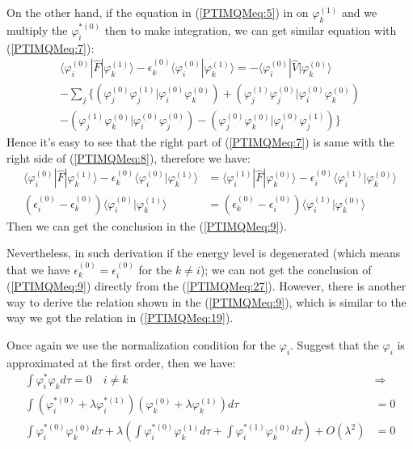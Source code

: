 On the other hand, if the equation in (\ref{PTIMQMeq:5}) in on
$\varphi^{(1)}_{k}$ and we multiply the $\varphi^{*(0)}_{i}$ then to
make integration, we can get similar equation with
(\ref{PTIMQMeq:7}):
\begin{multline}\label{PTIMQMeq:8}
\langle\varphi^{(0)}_{i}|\hat{F}|\varphi^{(1)}_{k}\rangle -
\epsilon^{(0)}_{k}\langle\varphi^{(0)}_{i}|\varphi^{(1)}_{k}\rangle
=
- \langle\varphi^{(0)}_{i}|\hat{V}|\varphi^{(0)}_{k}\rangle \\
-\sum_{j}\Bigg\{
\left(\varphi^{(0)}_{j}\varphi^{(1)}_{j}|\varphi^{(0)}_{i}\varphi^{(0)}_{k}\right)
+
\left(\varphi^{(1)}_{j}\varphi^{(0)}_{j}|\varphi^{(0)}_{i}\varphi^{(0)}_{k}\right)
\\
-
\left(\varphi^{(1)}_{j}\varphi^{(0)}_{k}|\varphi^{(0)}_{i}\varphi^{(0)}_{j}\right)
-
\left(\varphi^{(0)}_{j}\varphi^{(0)}_{k}|\varphi^{(0)}_{i}\varphi^{(1)}_{j}\right)
\Bigg\}
\end{multline}
Hence it's easy to see that the right part of (\ref{PTIMQMeq:7}) is
same with the right side of (\ref{PTIMQMeq:8}), therefore we have:
\begin{align}\label{PTIMQMeq:27}
\langle\varphi^{(0)}_{i}|\hat{F}|\varphi^{(1)}_{k}\rangle -
\epsilon^{(0)}_{k}\langle\varphi^{(0)}_{i}|\varphi^{(1)}_{k}\rangle
&=\langle\varphi^{(1)}_{i}|\hat{F}|\varphi^{(0)}_{k}\rangle -
\epsilon^{(0)}_{i}\langle\varphi^{(1)}_{i}|\varphi^{(0)}_{k}\rangle
\nonumber \\
(\epsilon^{(0)}_{i}-\epsilon^{(0)}_{k})
\langle\varphi^{(0)}_{i}|\varphi^{(1)}_{k}\rangle &=
(\epsilon^{(0)}_{k}-\epsilon^{(0)}_{i})
\langle\varphi^{(1)}_{i}|\varphi^{(0)}_{k}\rangle
\end{align}
Then we can get the conclusion in the (\ref{PTIMQMeq:9}).

Nevertheless, in such derivation if the energy level is degenerated
(which means that we have $\epsilon^{(0)}_{k}=\epsilon^{(0)}_{i}$
for the $k\neq i$); we can not get the conclusion of
(\ref{PTIMQMeq:9}) directly from the (\ref{PTIMQMeq:27}). However,
there is another way to derive the relation shown in the
(\ref{PTIMQMeq:9}), which is similar to the way we got the relation
in (\ref{PTIMQMeq:19}).

Once again we use the normalization condition for the $\varphi_{i}$.
Suggest that the $\varphi_{i}$ is approximated at the first order,
then we have:
\begin{align}\label{}
\int \varphi^{*}_{i}\varphi_{k} d\tau = 0 \quad  i\neq k &
\Rightarrow \nonumber \\
\int (\varphi^{*(0)}_{i} + \lambda\varphi^{*(1)}_{i})
(\varphi^{(0)}_{k} + \lambda\varphi^{(1)}_{k}) d\tau &=0 \nonumber
\\
\int\varphi^{*(0)}_{i}\varphi^{(0)}_{k} d\tau  + \lambda(\int
\varphi^{*(0)}_{i}\varphi^{(1)}_{k} d\tau + \int
\varphi^{*(1)}_{i}\varphi^{(0)}_{k} d\tau) + O(\lambda^{2}) &= 0
\end{align}

